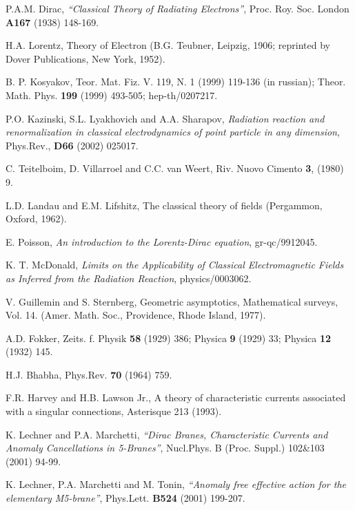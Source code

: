 \documentclass[a4paper,12pt]{article}
\begin{document}
\begin{thebibliography}{99}


  P.A.M. Dirac, {\it ``Classical Theory of Radiating Electrons''},
Proc. Roy. Soc. London {\bf A167} (1938) 148-169.

  H.A. Lorentz, Theory of Electron (B.G. Teubner, Leipzig,
1906; reprinted by Dover Publications, New York, 1952).


  B. P. Kosyakov, Teor. Mat. Fiz. V. 119, N. 1 (1999) 119-136
(in russian); Theor. Math. Phys. {\bf 199} (1999) 493-505;
hep-th/0207217.


 P.O. Kazinski, S.L. Lyakhovich and A.A. Sharapov, {\it Radiation
reaction and renormalization in classical electrodynamics of
point particle in any dimension}, Phys.Rev., {\bf D66} (2002)
025017.


  C. Teitelboim, D. Villarroel and C.C. van Weert, Riv. Nuovo
Cimento {\bf 3}, (1980) 9.

 L.D. Landau and E.M. Lifshitz, The classical theory
of fields (Pergammon, Oxford, 1962).

  E. Poisson, {\it An introduction to the Lorentz-Dirac
equation},  gr-qc/9912045.


 K. T. McDonald, {\it Limits on the Applicability of Classical Electromagnetic
Fields as Inferred from the Radiation Reaction}, physics/0003062.


 V. Guillemin and S. Sternberg, Geometric
asymptotics, Mathematical surveys, Vol. 14. (Amer. Math. Soc.,
Providence, Rhode Island, 1977).


 A.D. Fokker, Zeits. f. Physik {\bf 58} (1929) 386; Physica
{\bf 9} (1929) 33; Physica {\bf 12} (1932) 145.


 H.J. Bhabha, Phys.Rev. {\bf 70} (1964) 759.


 F.R. Harvey and H.B. Lawson Jr., A theory of characteristic currents
associated with a singular connections, Asterisque 213 (1993).

 K. Lechner and P.A. Marchetti, {\it ``Dirac Branes, Characteristic Currents
and Anomaly Cancellations in 5-Branes''}, Nucl.Phys. B (Proc.
Suppl.) 102\&103 (2001) 94-99.

 K. Lechner, P.A. Marchetti and M. Tonin, {\it ``Anomaly free effective action
for the elementary M5-brane''}, Phys.Lett. {\bf B524} (2001)
199-207.

\end{thebibliography}
\end{document}

